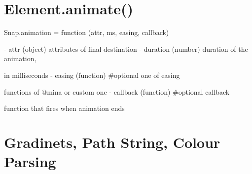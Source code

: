 \section{Element.animate()}
 Snap.animation = function (attr, ms, easing, callback) 

- attr (object) attributes of final destination
- duration (number) duration of the animation, 

in milliseconds
- easing (function) \#optional one of easing 

functions of @mina or custom one
- callback (function) \#optional callback 

function that fires when animation ends


\section{Gradinets, Path String, Colour Parsing}



